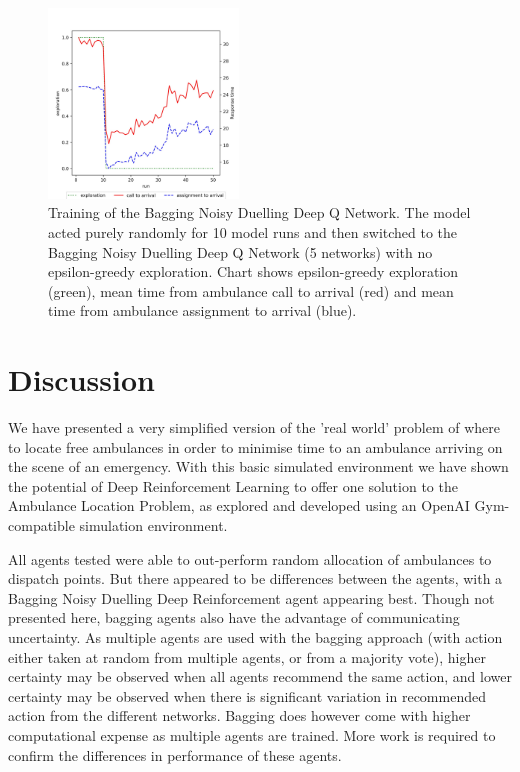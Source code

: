 \documentclass{article}
\begin{document}
\begin{figure}
\centering
\includegraphics[width=0.45\textwidth]{images/bagging_noisy_ddqn_3_ambo.jpg}
\caption{Training of the Bagging Noisy Duelling Deep Q Network. The model acted purely randomly for 10 model runs and then switched to the Bagging Noisy Duelling Deep Q Network (5 networks) with no epsilon-greedy exploration. Chart shows epsilon-greedy exploration (green), mean time from ambulance call to arrival (red) and mean time from ambulance assignment to arrival (blue).}
\label{fig:training}
\end{figure}


\section{Discussion}

We have presented a very simplified version of the 'real world' problem of where to locate free ambulances in order to minimise time to an ambulance arriving on the scene of an emergency. With this basic simulated environment we have shown the potential of Deep Reinforcement Learning to offer one solution to the Ambulance Location Problem, as explored and developed using an OpenAI Gym-compatible simulation environment.

All agents tested were able to out-perform random allocation of ambulances to dispatch points. But there appeared to be differences between the agents, with a Bagging Noisy Duelling Deep Reinforcement agent appearing best. Though not presented here, bagging agents also have the advantage of communicating uncertainty. As multiple agents are used with the bagging approach (with action either taken at random from multiple agents, or from a majority vote), higher certainty may be observed when all agents recommend the same action, and lower certainty may be observed when there is significant variation in recommended action from the different networks. Bagging does however come with higher computational expense as multiple agents are trained. More work is required to confirm the differences in performance of these agents.
\end{document}

